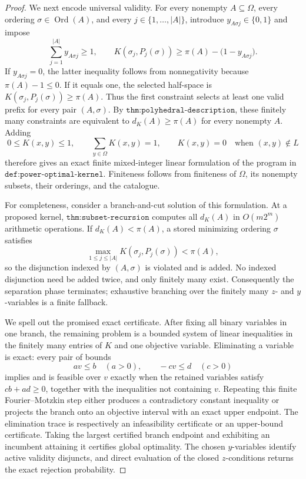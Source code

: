 \documentclass{article}
\begin{document}
\begin{proof}
We next encode universal validity.  For every nonempty \(A\subseteq\Omega\), every ordering \(\sigma\in\operatorname{Ord}(A)\), and every \(j\in\{1,\ldots,|A|\}\), introduce \(y_{A\sigma j}\in\{0,1\}\) and impose
\[
 \sum_{j=1}^{|A|}y_{A\sigma j}\geq1,
 \qquad
 K(\sigma_j,P_j(\sigma))
 \geq \pi(A)-\bigl(1-y_{A\sigma j}\bigr).
\]
If \(y_{A\sigma j}=0\), the latter inequality follows from nonnegativity because \(\pi(A)-1\leq0\).  If it equals one, the selected half-space is
\(K(\sigma_j,P_j(\sigma))\geq\pi(A)\).  Thus the first constraint selects at least one valid prefix for every pair \((A,\sigma)\).  By \(\texttt{thm:polyhedral-description}\), these finitely many constraints are equivalent to \(d_K(A)\geq\pi(A)\) for every nonempty \(A\).  Adding
\[
 0\leq K(x,y)\leq1,
 \qquad
 \sum_{y\in\Omega}K(x,y)=1,
 \qquad
 K(x,y)=0\quad\text{when }(x,y)\notin L
\]
therefore gives an exact finite mixed-integer linear formulation of the program in \(\texttt{def:power-optimal-kernel}\).  Finiteness follows from finiteness of \(\Omega\), its nonempty subsets, their orderings, and the catalogue.

For completeness, consider a branch-and-cut solution of this formulation.  At a proposed kernel, \(\texttt{thm:subset-recursion}\) computes all \(d_K(A)\) in \(O(m2^m)\) arithmetic operations.  If \(d_K(A)<\pi(A)\), a stored minimizing ordering \(\sigma\) satisfies
\[
 \max_{1\leq j\leq|A|}K(\sigma_j,P_j(\sigma))<\pi(A),
\]
so the disjunction indexed by \((A,\sigma)\) is violated and is added.  No indexed disjunction need be added twice, and only finitely many exist.  Consequently the separation phase terminates; exhaustive branching over the finitely many \(z\)- and \(y\)-variables is a finite fallback.

We spell out the promised exact certificate.  After fixing all binary variables in one branch, the remaining problem is a bounded system of linear inequalities in the finitely many entries of \(K\) and one objective variable.  Eliminating a variable is exact: every pair of bounds
\[
 a v\leq b\quad(a>0),
 \qquad
 -c v\leq d\quad(c>0)
\]
implies and is feasible over \(v\) exactly when the retained variables satisfy \(cb+ad\geq0\), together with the inequalities not containing \(v\).  Repeating this finite Fourier--Motzkin step either produces a contradictory constant inequality or projects the branch onto an objective interval with an exact upper endpoint.  The elimination trace is respectively an infeasibility certificate or an upper-bound certificate.  Taking the largest certified branch endpoint and exhibiting an incumbent attaining it certifies global optimality.  The chosen \(y\)-variables identify active validity disjuncts, and direct evaluation of the closed \(z\)-conditions returns the exact rejection probability.


\end{proof}
\end{document}
